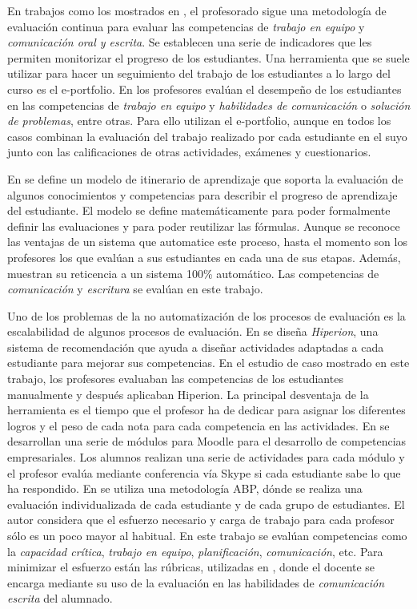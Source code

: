 En trabajos como los mostrados en \cite{martin2010new,prashar2010competence}, el profesorado sigue una metodología de evaluación continua para evaluar las competencias de \emph{trabajo en equipo} y \emph{comunicación oral y escrita}. Se establecen una serie de indicadores que les permiten monitorizar el progreso de los estudiantes. Una herramienta que se suele utilizar para hacer un seguimiento del trabajo de los estudiantes a lo largo del curso es el e-portfolio. En \cite{martin2013acquired,rodriguez2010portfolio,benlloch2007adapting} los profesores evalúan el desempeño de los estudiantes en las competencias de \emph{trabajo en equipo} y \emph{habilidades de comunicación} o \emph{solución de problemas}, entre otras. Para ello utilizan el e-portfolio, aunque en todos los casos combinan la evaluación del trabajo realizado por cada estudiante en el suyo junto con las calificaciones de otras actividades, exámenes y cuestionarios.

En \cite{yang2014fine} se define un modelo de itinerario de aprendizaje que soporta la evaluación de algunos conocimientos y competencias para describir el progreso de aprendizaje del estudiante. El modelo se define matemáticamente para poder formalmente definir las evaluaciones y para poder reutilizar las fórmulas. Aunque se reconoce las ventajas de un sistema que automatice este proceso, hasta el momento son los profesores los que evalúan a sus estudiantes en cada una de sus etapas. Además, muestran su reticencia a un sistema 100\% automático. Las competencias de \emph{comunicación} y \emph{escritura} se evalúan en este trabajo.

Uno de los problemas de la no automatización de los procesos de evaluación es la escalabilidad de algunos procesos de evaluación. En \cite{serrano2013hiperion} se diseña \emph{Hiperion}, una sistema de recomendación que ayuda a diseñar actividades adaptadas a cada estudiante para mejorar sus competencias. En el estudio de caso mostrado en este trabajo, los profesores evaluaban las competencias de los estudiantes manualmente y después aplicaban Hiperion. La principal desventaja de la herramienta es el tiempo que el profesor ha de dedicar para asignar los diferentes logros y el peso de cada nota para cada competencia en las actividades. En \cite{ward2011developing} se desarrollan una serie de módulos para Moodle para el desarrollo de competencias empresariales. Los alumnos realizan una serie de actividades para cada módulo y el profesor evalúa mediante conferencia vía Skype si cada estudiante sabe lo que ha respondido. En \cite{lacuesta2009active} se utiliza una metodología ABP, dónde se realiza una evaluación individualizada de cada estudiante y de cada grupo de estudiantes. El autor considera que el esfuerzo necesario y carga de trabajo para cada profesor sólo es un poco mayor al habitual. En este trabajo se evalúan competencias como la \emph{capacidad crítica}, \emph{trabajo en equipo}, \emph{planificación}, \emph{comunicación}, etc. Para minimizar el esfuerzo están las rúbricas, utilizadas en \cite{casan2015developing}, donde el docente se encarga mediante su uso de la evaluación en las habilidades de \emph{comunicación escrita} del alumnado.

